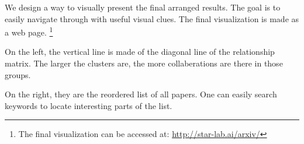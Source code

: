 We design a way to visually present the final arranged results.
The goal is to easily navigate through with useful visual clues.
The final visualization is made as a web page.
\footnote{The final visualization can be accessed at: \url{http://star-lab.ai/arxiv/}}

On the left, the vertical line is made of the diagonal line of the relationship matrix.
The larger the clusters are, the more collaberations are there in those groups.

On the right, they are the reordered list of all papers.
One can easily search keywords to locate interesting parts of the list.
